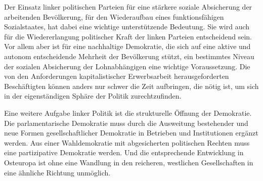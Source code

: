 \begin{multicols*}{2}
Der Einsatz linker politischen Parteien für eine stärkere soziale Absicherung der arbeitenden Bevölkerung, für den Wiederaufbau eines funktionsfähigen Sozialstaates, hat dabei eine wichtige unterstützende Bedeutung. Sie wird auch für die Wiedererlangung politischer Kraft der linken Parteien entscheidend sein. Vor allem aber ist für eine nachhaltige Demokratie, die sich auf eine aktive und autonom entscheidende Mehrheit der Bevölkerung stützt, ein bestimmtes Niveau der sozialen Absicherung der Lohnabhängigen eine wichtige Voraussetzung. Die von den Anforderungen kapitalistischer Erwerbsarbeit herausgeforderten Beschäftigten können anders nur schwer die Zeit aufbringen, die nötig ist, um sich in der eigenständigen Sphäre der Politik zurechtzufinden. 

Eine weitere Aufgabe linker Politik ist die strukturelle Öffnung der Demokratie. Die parlamentarische Demokratie muss durch die Ausweitung bestehender und neue Formen gesellschaftlicher Demokratie in Betrieben und Institutionen ergänzt werden. Aus einer Wahldemokratie mit abgesicherten politischen Rechten muss eine partizipative Demokratie werden. Und die entsprechende Entwicklung in Osteuropa ist ohne eine Wandlung in den reicheren, westlichen Gesellschaften in eine ähnliche Richtung unmöglich.\par

\printendnotes[custom]


\end{multicols*}
